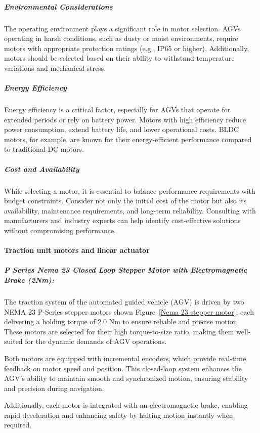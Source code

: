 \documentclass[../../main]{subfiles}
\begin{document}
\subparagraph{Environmental Considerations}
The operating environment plays a significant role in motor selection. AGVs operating in harsh conditions, such as dusty or moist environments, require motors with appropriate protection ratings (e.g., IP65 or higher). Additionally, motors should be selected based on their ability to withstand temperature variations and mechanical stress.

\subparagraph{Energy Efficiency}
Energy efficiency is a critical factor, especially for AGVs that operate for extended periods or rely on battery power. Motors with high efficiency reduce power consumption, extend battery life, and lower operational costs. BLDC motors, for example, are known for their energy-efficient performance compared to traditional DC motors.

\subparagraph{Cost and Availability}
While selecting a motor, it is essential to balance performance requirements with budget constraints. Consider not only the initial cost of the motor but also its availability, maintenance requirements, and long-term reliability. Consulting with manufacturers and industry experts can help identify cost-effective solutions without compromising performance.

\paragraph{Traction unit motors and linear actuator}


    
\subparagraph{P Series Nema 23 Closed Loop Stepper Motor with Electromagnetic
    Brake (2Nm):}
    
    The traction system of the automated guided vehicle (AGV)  
    is driven by two NEMA 23 P-Series stepper motors shown Figure~\ref{Nema 23 stepper motor},  
    each delivering a holding torque of 2.0 Nm to ensure  
    reliable and precise motion. These motors are selected  
    for their high torque-to-size ratio, making them well-suited  
    for the dynamic demands of AGV operations.  
    
    Both motors are equipped with incremental encoders, which provide real-time feedback  
    on motor speed and position. This closed-loop system  
    enhances the AGV's ability to maintain smooth and synchronized  
    motion, ensuring stability and precision during navigation.  
    
    Additionally, each motor is integrated with an electromagnetic  
    brake, enabling rapid deceleration and enhancing safety  
    by halting motion instantly when required. 
\end{document}
